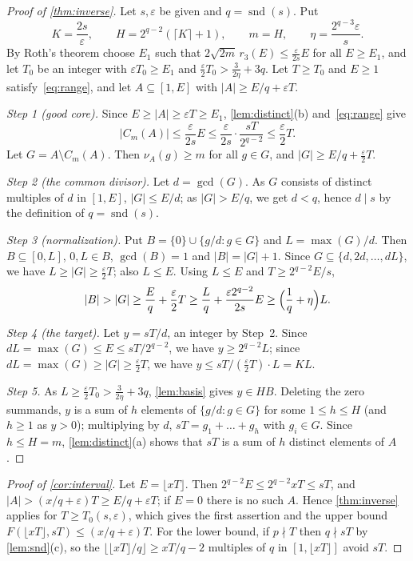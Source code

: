 \documentclass[11pt,reqno]{amsart}
\numberwithin{equation}{section}
\theoremstyle{definition}
\theoremstyle{remark}
\newcommand{\eps}{\varepsilon}
\newcommand{\card}[1]{\lvert #1\rvert}
\newcommand{\floor}[1]{\lfloor #1\rfloor}
\newcommand{\ceil}[1]{\lceil #1\rceil}
\newcommand{\snd}{\operatorname{snd}}
\begin{document}
\begin{proof}[Proof of \cref{thm:inverse}]
Let $s,\eps$ be given and $q=\snd(s)$. Put
\[
 K=\frac{2s}{\eps},\qquad H=2^{q-2}(\ceil K+1),\qquad m=H,\qquad \eta=\frac{2^{q-3}\eps}{s}.
\]
By Roth's theorem choose $E_1$ such that $2\sqrt{2m}\,r_3(E)\le\frac{\eps}{2s}E$ for all $E\ge E_1$, and let $T_0$ be an integer with $\eps T_0\ge E_1$ and $\frac\eps2T_0>\frac3{2\eta}+3q$. Let $T\ge T_0$ and $E\ge1$ satisfy~\eqref{eq:range}, and let $A\subseteq[1,E]$ with $\card A\ge E/q+\eps T$.

\emph{Step 1 (good core).} Since $E\ge\card A\ge\eps T\ge E_1$, \cref{lem:distinct}(b) and~\eqref{eq:range} give
\[
 \card{C_m(A)}\le\frac{\eps}{2s}E\le\frac\eps{2s}\cdot\frac{sT}{2^{q-2}}\le\frac\eps2T .
\]
Let $G=A\setminus C_m(A)$. Then $\nu_A(g)\ge m$ for all $g\in G$, and $\card G\ge E/q+\frac\eps2T$.

\emph{Step 2 (the common divisor).} Let $d=\gcd(G)$. As $G$ consists of distinct multiples of $d$ in $[1,E]$, $\card G\le E/d$; as $\card G>E/q$, we get $d<q$, hence $d\mid s$ by the definition of $q=\snd(s)$.

\emph{Step 3 (normalization).} Put $B=\{0\}\cup\{g/d:g\in G\}$ and $L=\max(G)/d$. Then $B\subseteq[0,L]$, $0,L\in B$, $\gcd(B)=1$ and $\card B=\card G+1$. Since $G\subseteq\{d,2d,\dots,dL\}$, we have $L\ge\card G\ge\frac\eps2T$; also $L\le E$. Using $L\le E$ and $T\ge2^{q-2}E/s$,
\[
 \card B>\card G\ge\frac Eq+\frac\eps2T\ge\frac Lq+\frac{\eps2^{q-2}}{2s}E\ge\Bigl(\frac1q+\eta\Bigr)L .
\]

\emph{Step 4 (the target).} Let $y=sT/d$, an integer by Step~2. Since $dL=\max(G)\le E\le sT/2^{q-2}$, we have $y\ge2^{q-2}L$; since $dL=\max(G)\ge\card G\ge\frac\eps2T$, we have $y\le sT/(\frac\eps2T)\cdot L=KL$.

\emph{Step 5.} As $L\ge\frac\eps2T_0>\frac3{2\eta}+3q$, \cref{lem:basis} gives $y\in HB$. Deleting the zero summands, $y$ is a sum of $h$ elements of $\{g/d:g\in G\}$ for some $1\le h\le H$ (and $h\ge1$ as $y>0$); multiplying by $d$, $sT=g_1+\dots+g_h$ with $g_i\in G$. Since $h\le H=m$, \cref{lem:distinct}(a) shows that $sT$ is a sum of $h$ distinct elements of $A$.
\end{proof}

\begin{proof}[Proof of \cref{cor:interval}]
Let $E=\floor{xT}$. Then $2^{q-2}E\le2^{q-2}xT\le sT$, and $\card A>(x/q+\eps)T\ge E/q+\eps T$; if $E=0$ there is no such $A$. Hence \cref{thm:inverse} applies for $T\ge T_0(s,\eps)$, which gives the first assertion and the upper bound $F(\floor{xT},sT)\le(x/q+\eps)T$. For the lower bound, if $p\nmid T$ then $q\nmid sT$ by \cref{lem:snd}(c), so the $\floor{\floor{xT}/q}\ge xT/q-2$ multiples of $q$ in $[1,\floor{xT}]$ avoid $sT$.
\end{proof}
\end{document}
